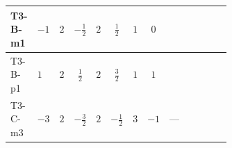 \documentclass[8pt]{article}
\begin{document}
\begin{landscape}
\begin{longtable}{@{}llcccccc >{\raggedright\arraybackslash}p{0.21\linewidth} >{\raggedright\arraybackslash}p{0.21\linewidth} >{\raggedright\arraybackslash}p{0.21\linewidth}@{}}
\midrule
T3-B-m1 & $-1$ & $2$ & $-\frac{1}{2}$ & $2$ & $\frac{1}{2}$ & $1$ & $0$ & \scriptsize\adjustbox{max width=\linewidth}{$\begin{gathered} {\lambda_{HS_1}^{(A)}} (2 T_{\nu}^{(1)}+6 \operatorname{Tr}\!\left({Y_d}\,\left({Y_d}\right)^{\dagger}\right)+2 \operatorname{Tr}\!\left({Y_e}\,\left({Y_e}\right)^{\dagger}\right)+6 \operatorname{Tr}\!\left({Y_u}\,\left({Y_u}\right)^{\dagger}\right))\end{gathered}$} & \scriptsize\adjustbox{max width=\linewidth}{$\begin{gathered} +\frac{8}{3} \operatorname{Tr}\!\left({y_1}\,\left({y_1}\right)^{\dagger}\,{Y_e}\,\left({Y_e}\right)^{\dagger}\right)\end{gathered}$} & \scriptsize\adjustbox{max width=\linewidth}{$\begin{gathered} +\frac{16}{3} {\lambda_5} \left({\lambda_5}\right)^{*}\end{gathered}$} \\
\midrule
T3-B-p1 & $1$ & $2$ & $\frac{1}{2}$ & $2$ & $\frac{3}{2}$ & $1$ & $1$ & \scriptsize\adjustbox{max width=\linewidth}{$\begin{gathered} {\lambda_{HS_1}^{(A)}} (2 T_{\nu}^{(1)}+6 \operatorname{Tr}\!\left({Y_d}\,\left({Y_d}\right)^{\dagger}\right)+2 \operatorname{Tr}\!\left({Y_e}\,\left({Y_e}\right)^{\dagger}\right)+6 \operatorname{Tr}\!\left({Y_u}\,\left({Y_u}\right)^{\dagger}\right))\end{gathered}$} & \scriptsize\adjustbox{max width=\linewidth}{$\begin{gathered} +\frac{8}{3} \operatorname{Tr}\!\left({y_1}\,\left({y_1}\right)^{\dagger}\,{Y_e}\,\left({Y_e}\right)^{\dagger}\right)\end{gathered}$} & \scriptsize\adjustbox{max width=\linewidth}{$\begin{gathered} +\frac{16}{3} {\lambda_5} \left({\lambda_5}\right)^{*}\end{gathered}$} \\
\midrule
T3-C-m3 & $-3$ & $2$ & $-\frac{3}{2}$ & $2$ & $-\frac{1}{2}$ & $3$ & $-1$ & --- & \scriptsize\adjustbox{max width=\linewidth}{$\begin{gathered} -\frac{4}{3} \operatorname{Tr}\!\left({y_1}\,\left({y_1}\right)^{\dagger}\,{Y_e}\,\left({Y_e}\right)^{\dagger}\right)\end{gathered}$} & \scriptsize\adjustbox{max width=\linewidth}{$\begin{gathered} +\frac{16}{3} {\lambda_5} \left({\lambda_5}\right)^{*}\end{gathered}$} \\

\end{longtable}
\end{landscape}
\end{document}
